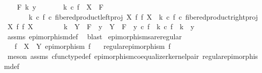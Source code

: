 \begin{isabellebody}
\isamarkupfalse%
\isanewline
\ \ \isamarkupfalse%
\ {\isachardoublequoteopen}{\isasymAnd}F\ k\ y{\isachardot}{\kern0pt}\isanewline
\ \ \ \ \ \ \ k\ {\isasymcirc}\isactrlsub c\ f\ {\isacharcolon}{\kern0pt}\ X\ {\isasymrightarrow}\ F\ {\isasymLongrightarrow}\isanewline
\ \ \ \ \ \ \ {\isacharparenleft}{\kern0pt}k\ {\isasymcirc}\isactrlsub c\ f{\isacharparenright}{\kern0pt}\ {\isasymcirc}\isactrlsub c\ fibered{\isacharunderscore}{\kern0pt}product{\isacharunderscore}{\kern0pt}left{\isacharunderscore}{\kern0pt}proj\ X\ f\ f\ X\ {\isacharequal}{\kern0pt}\ {\isacharparenleft}{\kern0pt}k\ {\isasymcirc}\isactrlsub c\ f{\isacharparenright}{\kern0pt}\ {\isasymcirc}\isactrlsub c\ fibered{\isacharunderscore}{\kern0pt}product{\isacharunderscore}{\kern0pt}right{\isacharunderscore}{\kern0pt}proj\ X\ f\ f\ X\ {\isasymLongrightarrow}\isanewline
\ \ \ \ \ \ \ k\ {\isacharcolon}{\kern0pt}\ Y\ {\isasymrightarrow}\ F\ {\isasymLongrightarrow}\ y\ {\isacharcolon}{\kern0pt}\ Y\ {\isasymrightarrow}\ F\ {\isasymLongrightarrow}\ y\ {\isasymcirc}\isactrlsub c\ f\ {\isacharequal}{\kern0pt}\ k\ {\isasymcirc}\isactrlsub c\ f\ {\isasymLongrightarrow}\ k\ {\isacharequal}{\kern0pt}\ y{\isachardoublequoteclose}\isanewline
\ \ \ \ \isamarkupfalse%
\ assms\ epimorphism{\isacharunderscore}{\kern0pt}def{}\ \isamarkupfalse%
\ blast\isanewline
{}\isamarkupfalse%
%
\endisatagproof
{\isafoldproof}%
%
\isadelimproof
\isanewline
%
\endisadelimproof
\isanewline
{}\isamarkupfalse%
\ epimorphisms{\isacharunderscore}{\kern0pt}are{\isacharunderscore}{\kern0pt}regular{\isacharcolon}{\kern0pt}\isanewline
\ \ \ {\isachardoublequoteopen}f\ {\isacharcolon}{\kern0pt}\ X\ {\isasymrightarrow}\ Y{\isachardoublequoteclose}\ {\isachardoublequoteopen}epimorphism\ f{\isachardoublequoteclose}\isanewline
\ \ \ {\isachardoublequoteopen}regular{\isacharunderscore}{\kern0pt}epimorphism\ f{\isachardoublequoteclose}\isanewline
%
\isadelimproof
\ \ %
\endisadelimproof
%
\isatagproof
{}\isamarkupfalse%
\ {\isacharparenleft}{\kern0pt}meson\ assms{\isacharparenleft}{\kern0pt}{}{\isacharparenright}{\kern0pt}\ cfunc{\isacharunderscore}{\kern0pt}type{\isacharunderscore}{\kern0pt}def\ epimorphism{\isacharunderscore}{\kern0pt}coequalizer{\isacharunderscore}{\kern0pt}kernel{\isacharunderscore}{\kern0pt}pair\ regular{\isacharunderscore}{\kern0pt}epimorphism{\isacharunderscore}{\kern0pt}def{\isacharparenright}{\kern0pt}%
\endisatagproof
{\isafoldproof}%
%
\isadelimproof

\end{isabellebody}
